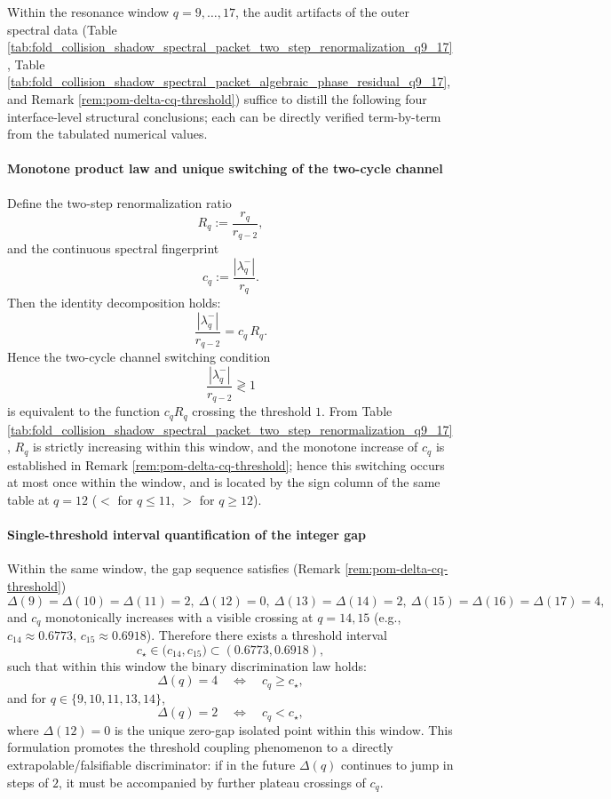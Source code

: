 \begin{remark}\label{rem:pom-resonance-window-final-structural-conclusions}
Within the resonance window \(q=9,\dots,17\), the audit artifacts of the outer spectral data (Table \ref{tab:fold_collision_shadow_spectral_packet_two_step_renormalization_q9_17}, Table \ref{tab:fold_collision_shadow_spectral_packet_algebraic_phase_residual_q9_17}, and Remark \ref{rem:pom-delta-cq-threshold}) suffice to distill the following four interface-level structural conclusions; each can be directly verified term-by-term from the tabulated numerical values.
\par

\paragraph{Monotone product law and unique switching of the two-cycle channel}
Define the two-step renormalization ratio
\[
R_q:=\frac{r_q}{r_{q-2}},
\]
and the continuous spectral fingerprint
\[
c_q:=\frac{|\lambda_q^-|}{r_q}.
\]
Then the identity decomposition holds:
\[
\frac{|\lambda_q^-|}{r_{q-2}}=c_q\,R_q.
\]
Hence the two-cycle channel switching condition
\[
\frac{|\lambda_q^-|}{r_{q-2}}\gtrless 1
\]
is equivalent to the function \(c_qR_q\) crossing the threshold \(1\).
From Table \ref{tab:fold_collision_shadow_spectral_packet_two_step_renormalization_q9_17}, \(R_q\) is strictly increasing within this window, and the monotone increase of \(c_q\) is established in Remark \ref{rem:pom-delta-cq-threshold};
hence this switching occurs at most once within the window, and is located by the sign column of the same table at \(q=12\) (\(<\) for \(q\le 11\), \(>\) for \(q\ge 12\)).
\par

\paragraph{Single-threshold interval quantification of the integer gap}
Within the same window, the gap sequence satisfies (Remark \ref{rem:pom-delta-cq-threshold})
\[
\Delta(9)=\Delta(10)=\Delta(11)=2,\ \Delta(12)=0,\ \Delta(13)=\Delta(14)=2,\ \Delta(15)=\Delta(16)=\Delta(17)=4,
\]
and \(c_q\) monotonically increases with a visible crossing at \(q=14,15\) (e.g., \(c_{14}\approx 0.6773\), \(c_{15}\approx 0.6918\)).
Therefore there exists a threshold interval
\[
c_\star\in\bigl(c_{14},c_{15}\bigr)\subset(0.6773,0.6918),
\]
such that within this window the binary discrimination law holds:
\[
\Delta(q)=4\quad\Longleftrightarrow\quad c_q\ge c_\star,
\]
and for \(q\in\{9,10,11,13,14\}\),
\[
\Delta(q)=2\quad\Longleftrightarrow\quad c_q<c_\star,
\]
where \(\Delta(12)=0\) is the unique zero-gap isolated point within this window.
This formulation promotes the threshold coupling phenomenon to a directly extrapolable/falsifiable discriminator: if in the future \(\Delta(q)\) continues to jump in steps of \(2\), it must be accompanied by further plateau crossings of \(c_q\).
\par


\end{remark}
